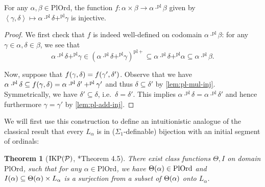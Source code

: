 \documentclass[12pt,openany]{book}
\theoremstyle{plain}
\newtheorem{theorem}{Theorem}[section]
\theoremstyle{definition}
\newcommand\tuple[1]{\left\langle #1 \right\rangle}
\newcommand\Pow{\mathcal{P}}
\newcommand\IKPP{\mathrm{IKP}\mleft(\Pow\mright)}
\newcommand\PlOrd{\mathrm{PlOrd}}
\newcommand\pl{\mathrm{pl}}
\newcommand\pls{{\pl +}}
\begin{document}
\begin{corollary}
  \label{cor:pl-ord-code-pairs}
  For any $\alpha, \beta \in \PlOrd$, the function $f : \alpha \times \beta \rightarrow \alpha \cdot^\pl \beta$ given by $\tuple{\gamma, \delta} \mapsto \alpha \cdot^\pl \delta +^\pl \gamma$ is injective.
\end{corollary}

\begin{proof}
  We first check that $f$ is indeed well-defined on codomain $\alpha \cdot^\pl \beta$: for any $\gamma \in \alpha, \delta \in \beta$, we see that
  \[\alpha \cdot^\pl \delta +^\pl \gamma \in \left(\alpha \cdot^\pl \delta +^\pl \gamma\right)^\pls \subseteq \alpha \cdot^\pl \delta +^\pl \alpha \subseteq \alpha \cdot^\pl \beta.\]

  Now, suppose that $f\mleft(\gamma, \delta\mright) = f\mleft(\gamma', \delta'\mright)$. Observe that we have $\alpha \cdot^\pl \delta \subseteq f\mleft(\gamma, \delta\mright) = \alpha \cdot^\pl \delta' +^\pl \gamma'$ and thus $\delta \subseteq \delta'$ by \autoref{lem:pl-mul-inj}. Symmetrically, we have $\delta' \subseteq \delta$, i.e.\ $\delta = \delta'$. This implies $\alpha \cdot^\pl \delta = \alpha \cdot^\pl \delta'$ and hence furthermore $\gamma = \gamma'$ by \autoref{lem:pl-add-inj}.
\end{proof}

We will first use this construction to define an intuitionistic analogue of the classical result that every $L_\alpha$ is in ($\Sigma_1$-definable) bijection with an initial segment of ordinals:
\begin{theorem}[$\IKPP$, \cite{wang-sw26-plump}*{Theorem 4.5}]
  \label{thm:l-pl-ord-surj}
  There exist class functions $\Theta, I$ on domain $\PlOrd$, such that for any $\alpha \in \PlOrd$, we have $\Theta\mleft(\alpha\mright) \in \PlOrd$ and $I\mleft(\alpha\mright) \subseteq \Theta\mleft(\alpha\mright) \times L_\alpha$ is a surjection from a subset of $\Theta\mleft(\alpha\mright)$ onto $L_\alpha$.
\end{theorem}
\end{document}
